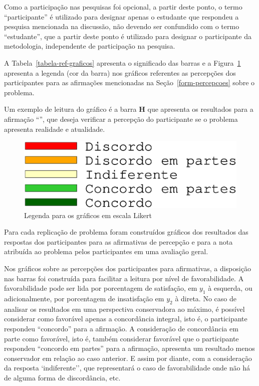 Como a participação nas pesquisas foi opcional, a partir deste ponto, 
o termo  ``participante'' é utilizado para designar apenas 
o estudante que respondeu a pesquisa mencionada na discussão,
não devendo ser confundido com o termo ``estudante'', que a partir deste ponto
é utilizado para designar o participante da metodologia, independente
de participação na pesquisa.

A Tabela~\ref{tabela-ref-graficos} apresenta o significado das barras
e a Figura~\ref{figura-ref-graficos} apresenta a legenda (cor da barra)
nos gráficos referentes as percepções dos participantes para as
afirmações mencionadas na Seção~\ref{form-percepcoes} sobre
o problema.



Um exemplo de leitura do gráfico é a barra \textbf{H} que apresenta
os resultados para a afirmação ``\LikertPH'', que deseja verificar
a percepção do participante se o problema apresenta realidade
e atualidade.

\begin{figure}[!htb]
\centering
\includegraphics[scale=0.25,trim={50cm 15cm 0cm 10cm},clip]{figura-ref-graficos.eps}
\caption{Legenda para os gráficos em escala Likert} 
\label{figura-ref-graficos}
\end{figure}

Para cada replicação de problema foram construídos gráficos
dos resultados das respostas dos participantes para as afirmativas
de percepção e para a nota atribuída ao problema pelos
participantes em uma avaliação geral.


Nos gráficos sobre as percepções dos participantes
para afirmativas, a disposição nas barras
foi construída para facilitar a leitura por nível de favorabilidade.
A favorabilidade pode ser lida por porcentagem de satisfação,
em $y_1$ à esquerda, ou adicionalmente, por porcentagem de
insatisfação em $y_2$ à direta.
No caso de analisar os resultados em uma perspectiva conservadora ao máximo,
é possível considerar como favorável apenas a concordância
integral, isto é, o participante respondeu ``concordo'' para
a afirmação.
A consideração de concordância em parte como favorável,
isto é, também considerar favorável que
o participante respondeu ``concordo em partes'' para a afirmação,
apresenta um resultado menos conservador em relação ao caso anterior.
E assim por diante, com a consideração da resposta `indiferente'', que
representará o caso de favorabilidade onde não há de alguma forma de
discordância, etc.

